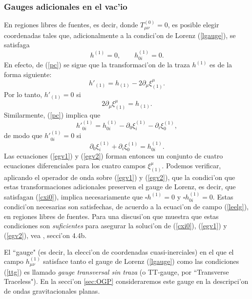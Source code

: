 \subsubsection{Gauges adicionales en el vac'io}

En regiones libres de fuentes, es decir, donde $T^{(0)}_{\mu\nu}=0$, es posible elegir coordenadas tales que, adicionalmente a la condici'on de Lorenz (\ref{lgauge}), se satisfaga
\begin{equation}\label{ttg}
\boxed{h^{(1)}=0, \qquad h_{0i}^{(1)}=0.}
\end{equation}
En efecto, de (\ref{pc}) se sigue que la transformaci'on de la traza $h^{(1)}$ es de la forma siguiente:
\begin{equation}
h'_{(1)}= h_{(1)}- 2\partial_\mu\xi_{(1)}^\mu .
\end{equation}
Por lo tanto, $h'_{(1)}=0$ si
\begin{equation}
2\partial_\mu\xi_{(1)}^\mu = h_{(1)}. \label{egv1}
\end{equation}
Similarmente, (\ref{pc}) implica que
\begin{equation}
h'^{(1)}_{0i}= h^{(1)}_{0i} -\partial_0\xi^{(1)}_i-\partial_i\xi^{(1)}_0,
\end{equation}
de modo que $h'^{(1)}_{0i}=0$ si
\begin{equation}
\partial_0\xi^{(1)}_i+\partial_i\xi^{(1)}_0= h^{(1)}_{0i} . \label{egv2}
\end{equation}
Las ecuaciones (\ref{egv1}) y (\ref{egv2}) forman entonces un conjunto de cuatro ecuaciones diferenciales para los cuatro campos $\xi_{(1)}^\mu$. Podemos verificar, aplicando el operador de onda sobre (\ref{egv1}) y (\ref{egv2}), que la condici'on que estas transformaciones adicionales preserven el gauge de Lorenz, es decir, que satisfagan (\ref{cxi0}), implica necesariamente que $\square h^{(1)}=0$ y $\square h^{(1)}_{0i}=0$. Estas condici'on necesarias son satisfechas, de acuerdo a la ecuaci'on de campo (\ref{leelg}), en regiones libres de fuentes. Para una discusi'on que muestra que estas condiciones son \textit{suficientes} para asegurar la soluci'on de (\ref{cxi0}), (\ref{egv1}) y (\ref{egv2}), vea \cite{Wald84}, secci'on 4.4b.

El ``gauge" (es decir, la elecci'on de coordenadas cuasi-inerciales) en el que el campo $h^{(1)}_{\mu\nu}$ satisface tanto el gauge de Lorenz (\ref{lgauge}) como las condiciones (\ref{ttg}) es llamado \textit{gauge transversal sin traza} (o TT-gauge, por ``Transverse Traceless"). En la secci'on \ref{sec:OGP} consideraremos este gauge en la descripci'on de ondas gravitacionales planas.


